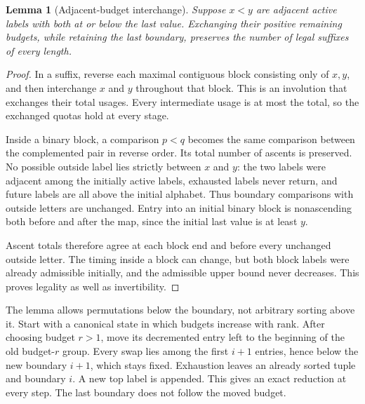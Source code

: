 \documentclass[11pt,letterpaper]{article}
\newtheorem{lemma}[theorem]{Lemma}
\theoremstyle{remark}\newtheorem{remark}[theorem]{Remark}
\begin{document}
\begin{lemma}[Adjacent-budget interchange]\label{amc:lem:swap}
Suppose $x<y$ are adjacent active labels with both at or below the last value. Exchanging their positive remaining budgets, while retaining the last boundary, preserves the number of legal suffixes of every length.
\end{lemma}
\begin{proof}
In a suffix, reverse each maximal contiguous block consisting only of $x,y$, and then interchange $x$ and $y$ throughout that block. This is an involution that exchanges their total usages. Every intermediate usage is at most the total, so the exchanged quotas hold at every stage.

Inside a binary block, a comparison $p<q$ becomes the same comparison between the complemented pair in reverse order. Its total number of ascents is preserved. No possible outside label lies strictly between $x$ and $y$: the two labels were adjacent among the initially active labels, exhausted labels never return, and future labels are all above the initial alphabet. Thus boundary comparisons with outside letters are unchanged. Entry into an initial binary block is nonascending both before and after the map, since the initial last value is at least $y$.

Ascent totals therefore agree at each block end and before every unchanged outside letter. The timing inside a block can change, but both block labels were already admissible initially, and the admissible upper bound never decreases. This proves legality as well as invertibility.
\end{proof}
The lemma allows permutations below the boundary, not arbitrary sorting above it. Start with a canonical state in which budgets increase with rank. After choosing budget $r>1$, move its decremented entry left to the beginning of the old budget-$r$ group. Every swap lies among the first $i+1$ entries, hence below the new boundary $i+1$, which stays fixed. Exhaustion leaves an already sorted tuple and boundary $i$. A new top label is appended. This gives an exact reduction at every step. The last boundary does not follow the moved budget.
\end{document}
